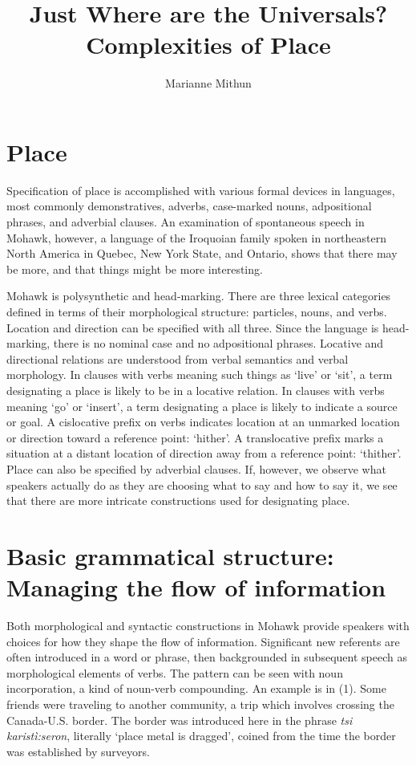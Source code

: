 \documentclass[output=paper,colorlinks,citecolor=brown
]{langscibook}
\author{Marianne Mithun\orcid{}\affiliation{University of California, Santa Barbara}}
\title{Just Where are the Universals?
Complexities of Place
}
\begin{document}
\maketitle
\section{Place}

Specification of place is accomplished with various formal devices in languages, most commonly demonstratives, adverbs, case-marked nouns, adpositional phrases, and adverbial clauses. An examination of spontaneous speech in Mohawk, however, a language of the Iroquoian family spoken in northeastern North America in Quebec, New York State, and Ontario, shows that there may be more, and that things might be more interesting.

Mohawk is polysynthetic and head-marking. There are three lexical categories defined in terms of their morphological structure: particles, nouns, and verbs. Location and direction can be specified with all three. Since the language is head-marking, there is no nominal case and no adpositional phrases. Locative and directional relations are understood from verbal semantics and verbal morphology. In clauses with verbs meaning such things as `live' or `sit', a term designating a place is likely to be in a locative relation. In clauses with verbs meaning `go' or `insert', a term designating a place is likely to indicate a source or goal. A cislocative prefix on verbs indicates location at an unmarked location or direction toward a reference point: `hither'. A translocative prefix marks a situation at a distant location of direction away from a reference point: `thither'. Place can also be specified by adverbial clauses. If, however, we observe what speakers actually do as they are choosing what to say and how to say it, we see that there are more intricate constructions used for designating place. 
\section{Basic grammatical structure: Managing the flow of information}
 Both morphological and syntactic constructions in Mohawk provide speakers with choices for how they shape the flow of information. Significant new referents are often introduced in a word or phrase, then backgrounded in subsequent speech as morphological elements of verbs. The pattern can be seen with noun incorporation, a kind of noun-verb compounding. An example is in (1). Some friends were traveling to another community, a trip which involves crossing the Canada-U.S. border. The border was introduced here in the phrase \emph{tsi karistì:seron}, literally `place metal is dragged', coined from the time the border was established by surveyors. \vspace{5mm}
\end{document}
